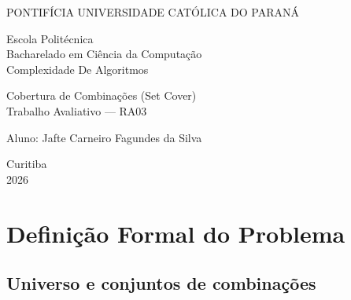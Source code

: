 \documentclass[12pt,a4paper]{article}
\theoremstyle{definition}
\begin{document}

\begin{titlepage}
\thispagestyle{empty}
\begingroup
{}\selectfont
\fontsize{14pt}{14pt}\selectfont
\bfseries
\singlespacing
\setlength{\parindent}{0pt}
\setlength{\parskip}{0pt}

\begin{center}
PONTIFÍCIA UNIVERSIDADE CATÓLICA DO PARANÁ

\vspace{6\baselineskip}

Escola Politécnica\\
Bacharelado em Ciência da Computação\\
Complexidade De Algoritmos
\end{center}

\vspace{6\baselineskip}

\hspace*{6.244cm}\begin{minipage}{\dimexpr\linewidth-6.244cm\relax}
Cobertura de Combinações (Set Cover)\\
Trabalho Avaliativo — RA03

\vspace{2\baselineskip}

Aluno: Jafte Carneiro Fagundes da Silva
\end{minipage}

\vfill

\begin{center}
Curitiba\\
2026
\end{center}
\endgroup
\end{titlepage}
\restoregeometry

\tableofcontents
\newpage

\section{Definição Formal do Problema}

\subsection{Universo e conjuntos de combinações}
\end{document}
